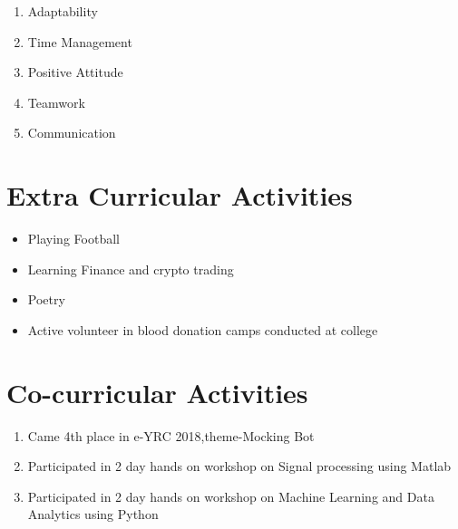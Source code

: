 \documentclass[12pt,a4paper,sans]{moderncv} %
\begin{document}
\begin{table}
\begin{enumerate}
	\item Adaptability
	\item Time Management
	\item Positive Attitude
	\item Teamwork
	\item Communication		
\end{enumerate}



\section{Extra Curricular Activities}

\begin{itemize}
	\item Playing Football
	\item Learning Finance and crypto trading
	\item Poetry 
	\item Active volunteer in blood donation camps conducted at college 
\end{itemize}

\hfill
\hfill
\hfill
\hfill
\hfill
\break
\section{Co-curricular Activities}

\begin{enumerate}
	\item Came 4th place in e-YRC 2018,theme-Mocking Bot
	\item Participated in 2 day hands on workshop on Signal processing using Matlab
	\item Participated in 2 day hands on workshop on Machine Learning and Data Analytics using Python
	
\end{enumerate}



\end{table}
\end{document}
